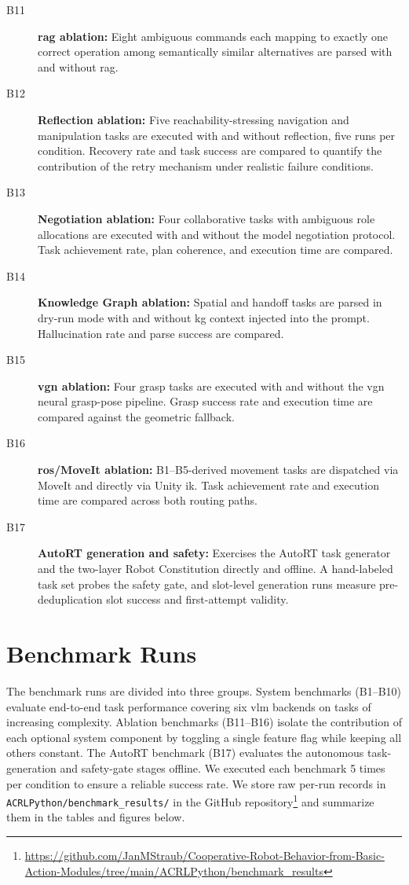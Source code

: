 \documentclass[
     12pt,
     a4paper,
     BCOR=10mm,
     DIV=14,
     listof=totoc,
     bibliography=totoc,
     parskip,
     twoside,
     headsepline
     ]{scrreprt}
\begin{document}
\begin{description}
	\item[B11] \textbf{\gls{rag} ablation:} Eight ambiguous commands each mapping to exactly one correct operation among semantically similar alternatives are parsed with and without \gls{rag}.
	\item[B12] \textbf{Reflection ablation:} Five reachability-stressing navigation and manipulation tasks are executed with and without reflection, five runs per condition. Recovery rate and task success are compared to quantify the contribution of the retry mechanism under realistic failure conditions.
	\item[B13] \textbf{Negotiation ablation:} Four collaborative tasks with ambiguous role allocations are executed with and without the model negotiation protocol. Task achievement rate, plan coherence, and execution time are compared.
	\item[B14] \textbf{Knowledge Graph ablation:} Spatial and handoff tasks are parsed in dry-run mode with and without \gls{kg} context injected into the prompt. Hallucination rate and parse success are compared.
	\item[B15] \textbf{\gls{vgn} ablation:} Four grasp tasks are executed with and without the \gls{vgn} neural grasp-pose pipeline. Grasp success rate and execution time are compared against the geometric fallback.
	\item[B16] \textbf{\gls{ros}/MoveIt ablation:} B1--B5-derived movement tasks are dispatched via MoveIt and directly via Unity \gls{ik}. Task achievement rate and execution time are compared across both routing paths.
	\item[B17] \textbf{AutoRT generation and safety:} Exercises the AutoRT task generator and the two-layer Robot Constitution directly and offline. A hand-labeled task set probes the safety gate, and slot-level generation runs measure pre-deduplication slot success and first-attempt validity.
\end{description}

\section{Benchmark Runs}\label{appendix:benchmark_runs}
The benchmark runs are divided into three groups. System benchmarks (B1--B10) evaluate end-to-end task performance covering six \gls{vlm} backends on tasks of increasing complexity. Ablation benchmarks (B11--B16) isolate the contribution of each optional system component by toggling a single feature flag while keeping all others constant. The AutoRT benchmark (B17) evaluates the autonomous task-generation and safety-gate stages offline. We executed each benchmark 5 times per condition to ensure a reliable success rate. We store raw per-run records in \texttt{ACRLPython/benchmark\_results/} in the GitHub repository\footnote{\url{https://github.com/JanMStraub/Cooperative-Robot-Behavior-from-Basic-Action-Modules/tree/main/ACRLPython/benchmark_results}} and summarize them in the tables and figures below.
\end{document}
